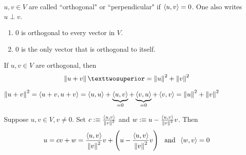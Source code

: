 \setcounter{thm}{9}
\begin{mydef}[orthogonal]
  $u,v \in V$ are called ``orthogonal" or ``perpendicular" if $\left \langle u, v \right \rangle =0$. One also writes $u \perp v$.
\end{mydef}

\begin{thm} 
  \begin{enumerate}[label=(\alph*)]
    \item $0$ is orthogonal to every vector in $V$.
    \item $0$ is the only vector that is orthogonal to itself.
  \end{enumerate}
\end{thm}

\begin{thm}
  If $u,v \in V$ are orthogonal, then
  \begin{equation}
    \norm{u+v}² = \norm{u}^2 + \norm{v}^2
  \end{equation}
\end{thm}
\begin{prf} 
  $\left \lVert u+v \right \rVert^2 = \left \langle u+v, u+v \right \rangle = \left \langle u, u \right \rangle + \underbrace{\left \langle u, v \right \rangle}_{=0} + \underbrace{\left \langle v, u \right \rangle}_{=0} + \left \langle v, v \right \rangle = \left \lVert u \right \rVert^2 + \left \lVert v \right \rVert^2 $
\end{prf}

\setcounter{thm}{12}
\begin{thm}
  \label{thm: an orthogonal decomposition}
  Suppose $u,v \in V, v\neq 0.$ Set $c :\equiv \frac{\left \langle u, v \right \rangle}{\left \lVert v \right \rVert^2}$ and $w :\equiv u-\frac{\left \langle u, v \right \rangle}{\left \lVert v \right \rVert^2}v$. Then
  \begin{equation}
    u = cv+w = \frac{\left \langle u, v \right \rangle}{\left \lVert v \right \rVert^2} v + \left( u- \frac{\left \langle u, v \right \rangle}{\left \lVert v \right \rVert^2} v \right  ) \;\;\, \text{and}\;\; \left \langle w, v \right \rangle=0
  \end{equation}
\end{thm}

